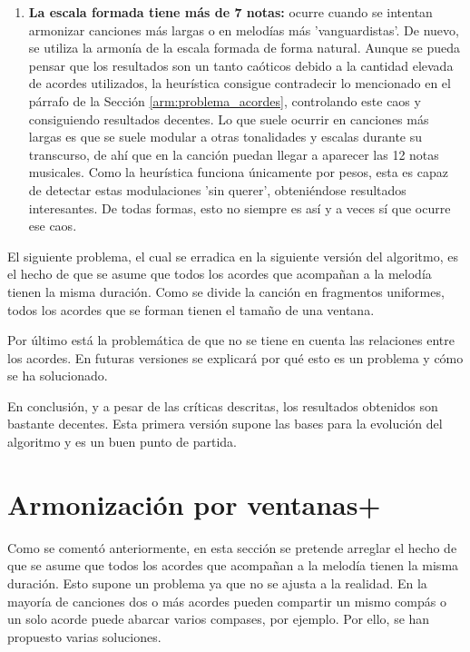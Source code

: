 \begin{enumerate}
    \item[\textbullet] \textbf{La escala formada tiene más de 7 notas:} ocurre cuando se intentan armonizar canciones más largas o en melodías más 'vanguardistas'. De nuevo, se utiliza la armonía de la escala formada de forma natural. Aunque se pueda pensar que los resultados son un tanto caóticos debido a la cantidad elevada de acordes utilizados, la heurística consigue contradecir lo mencionado en el párrafo de la Sección \ref{arm:problema_acordes}, controlando este caos y consiguiendo resultados decentes. Lo que suele ocurrir en canciones más largas es que se suele modular a otras tonalidades y escalas durante su transcurso, de ahí que en la canción puedan llegar a aparecer las 12 notas musicales. Como la heurística funciona únicamente por pesos, esta es capaz de detectar estas modulaciones 'sin querer', obteniéndose resultados interesantes. De todas formas, esto no siempre es así y a veces sí que ocurre ese caos.

\end{enumerate}

    El siguiente problema, el cual se erradica en la siguiente versión del algoritmo, es el hecho de que se asume que todos los acordes que acompañan a la melodía tienen la misma duración. Como se divide la canción en fragmentos uniformes, todos los acordes que se forman tienen el tamaño de una ventana.

    Por último está la problemática de que no se tiene en cuenta las relaciones entre los acordes. En futuras versiones se explicará por qué esto es un problema y cómo se ha solucionado.

    En conclusión, y a pesar de las críticas descritas, los resultados obtenidos son bastante decentes. Esta primera versión  supone las bases para la evolución del algoritmo y es un buen punto de partida.

\section{Armonización por ventanas+}\label{arm:subsec:ventanas_plus}

Como se comentó anteriormente, en esta sección se pretende arreglar el hecho de que se asume que todos los acordes que acompañan a la melodía tienen la misma duración. Esto supone un problema ya que no se ajusta a la realidad. En la mayoría de canciones dos o más acordes pueden compartir un mismo compás o un solo acorde puede abarcar varios compases, por ejemplo. Por ello, se han propuesto varias soluciones.

